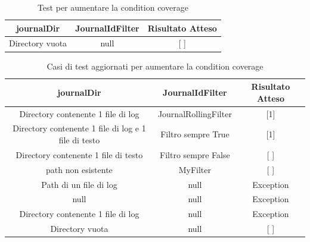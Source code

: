 \documentclass[12pt, a4paper]{article}
\begin{document}
\begin{table}[ht]
  \centering
  \caption[Journal: Test Suite - Adequacy Control Flow 3]{Test per aumentare la condition coverage}
  \begin{tabular}{|c|c|c|}
    \hline
    journalDir & JournalIdFilter & Risultato Atteso \\
    \hline
    {Directory vuota} & null & [ ] \\
    \hline
  \end{tabular}
  \label{tab:ACF3ListJournalIds}
  \end{table}

\begin{table}[ht]
  \centering
  \caption[Journal: Test Suite - Adequacy Control Flow 4]{Casi di test aggiornati per aumentare la condition coverage}
  \begin{tabular}{|c|c|c|}
  \hline
  journalDir & JournalIdFilter & Risultato Atteso \\
  \hline
  {Directory contenente 1 file di log} & JournalRollingFilter & [1] \\
  {Directory contenente 1 file di log e 1 file di testo} & Filtro sempre True & [1] \\
  {Directory contenente 1 file di testo} & Filtro sempre False & [ ] \\
  {path non esistente} & MyFilter & [ ] \\
  {Path di un file di log} & null & Exception \\
  null & null & Exception \\
  {Directory contenente 1 file di log} & null & Exception \\
  {Directory vuota} & null & [ ] \\
  \hline
  \end{tabular}
  \label{tab:ACF2ListJournalIds}
  \end{table}
\end{document}
